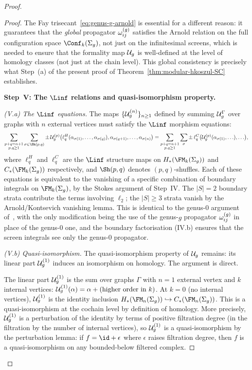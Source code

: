 \begin{proof}
\begin{proof}
The Fay trisecant~\eqref{eq:genus-g-arnold} is essential
for a different reason: it guarantees that the \emph{global}
propagator $\omega^{(g)}_{ij}$ satisfies the Arnold relation on
the full configuration space $\Conf_k(\Sigma_g)$,
not just on the infinitesimal screens, which is needed to
ensure that the formality map $\mathcal{U}_g$ is well-defined
at the level of homology classes (not just at the chain
level). This global consistency is precisely what
Step~(a) of the present proof of
Theorem~\ref{thm:modular-hkoszul-SC} establishes.

\bigskip\noindent
\textbf{Step~V: The $\Linf$ relations and quasi-isomorphism
property.}

\medskip\noindent
\emph{(V.a) The $\Linf$ equations.}
The maps $\{\mathcal{U}_g^{(n)}\}_{n \ge 1}$ defined by summing
$\mathcal{U}_g^\Gamma$ over graphs with $n$ external vertices
must satisfy the $\Linf$ morphism equations:
\begin{equation}\label{eq:Linfty-morphism-equations}
 \sum_{\substack{p + q = n+1 \\ p,q \ge 1}}
 \sum_{\sigma \in \Sh(p,q)}
 \pm\, \cU_g^{(p)}\bigl(
 \ell_q^{H}(\alpha_{\sigma(1)}, \ldots,
 \alpha_{\sigma(q)}),
 \alpha_{\sigma(q+1)}, \ldots, \alpha_{\sigma(n)}\bigr)
 = \sum_{\substack{p + q = n+1 \\ p,q \ge 1}}
 \sum_\sigma \pm\,
 \ell_q^{C}\bigl(\cU_g^{(p)}(\alpha_{\sigma(1)}, \ldots),
 \ldots\bigr),
\end{equation}
where $\ell_q^H$ and $\ell_q^C$ are the $\Linf$ structure
maps on $H_\ast(\FMg{k})$ and $C_\ast(\FMg{k})$
respectively, and $\Sh(p,q)$ denotes $(p,q)$-shuffles.
Each of these equations is equivalent to the vanishing of
a specific combination of boundary integrals on $\FMg{k}$,
by the Stokes argument of Step~IV. The $|S| = 2$ boundary
strata contribute the terms involving $\ell_2$; the
$|S| \ge 3$ strata vanish by the Arnold/Kontsevich vanishing
lemma. This is identical to the genus-$0$ argument
of~\cite{Kon03}, with the only modification being the use of
the genus-$g$ propagator $\omega^{(g)}_{ij}$ in place of the
genus-$0$ one, and the boundary factorisation (IV.b) ensures
that the screen integrals see only the genus-$0$ propagator.

\medskip\noindent
\emph{(V.b) Quasi-isomorphism.}
The quasi-isomorphism property of $\mathcal{U}_g$ remains:
its linear part $\mathcal{U}_g^{(1)}$ induces an isomorphism
on homology. The argument is direct.

The linear part $\mathcal{U}_g^{(1)}$ is the sum over graphs $\Gamma$
with $n = 1$ external vertex and $k$ internal vertices:
$\mathcal{U}_g^{(1)}(\alpha) = \alpha + (\text{higher order in }k)$.
At $k = 0$ (no internal vertices), $\mathcal{U}_g^{(1)}$ is the
identity inclusion
$H_\ast(\FMg{n}) \hookrightarrow C_\ast(\FMg{n})$.
This is a quasi-isomorphism at the cochain level by definition
of homology. More precisely, $\mathcal{U}_g^{(1)}$ is a perturbation
of the identity by terms of positive filtration degree (in
the filtration by the number of internal vertices), so
$\mathcal{U}_g^{(1)}$ is a quasi-isomorphism by the perturbation
lemma: if $f = \id + \epsilon$ where $\epsilon$ raises
filtration degree, then $f$ is a quasi-isomorphism on any
bounded-below filtered complex.


\end{proof}
\end{proof}
